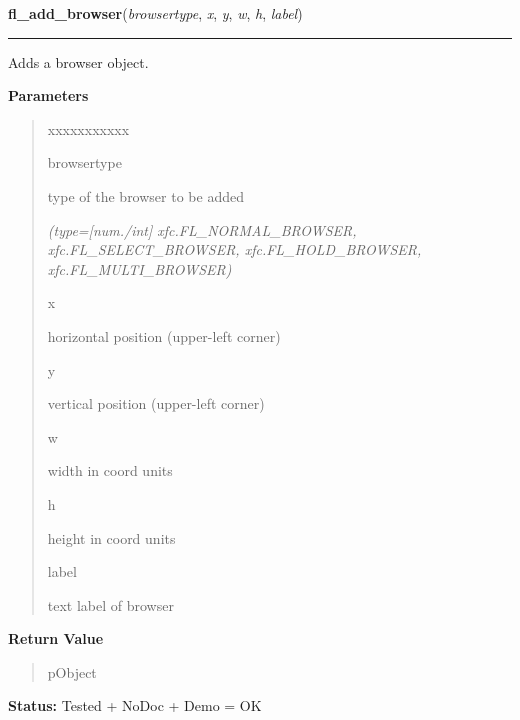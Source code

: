     \label{xformslib:library:fl_add_browser}

    \vspace{0.5ex}

\hspace{.8\funcindent}\begin{boxedminipage}{\funcwidth}

    \raggedright \textbf{fl\_add\_browser}(\textit{browsertype}, \textit{x}, \textit{y}, \textit{w}, \textit{h}, \textit{label})

    \vspace{-1.5ex}

    \rule{\textwidth}{0.5\fboxrule}
\setlength{\parskip}{2ex}
    Adds a browser object.

\setlength{\parskip}{1ex}
      \textbf{Parameters}
      \vspace{-1ex}

      \begin{quote}
        \begin{Ventry}{xxxxxxxxxxx}

          \item[browsertype]

          type of the browser to be added

            {\it (type=[num./int] xfc.FL\_NORMAL\_BROWSER, xfc.FL\_SELECT\_BROWSER, 
xfc.FL\_HOLD\_BROWSER, xfc.FL\_MULTI\_BROWSER)}

          \item[x]

          horizontal position (upper-left corner)

          \item[y]

          vertical position (upper-left corner)

          \item[w]

          width in coord units

          \item[h]

          height in coord units

          \item[label]

          text label of browser

        \end{Ventry}

      \end{quote}

      \textbf{Return Value}
    \vspace{-1ex}

      \begin{quote}
      pObject

      \end{quote}

\textbf{Status:} Tested + NoDoc + Demo = OK



    \end{boxedminipage}

